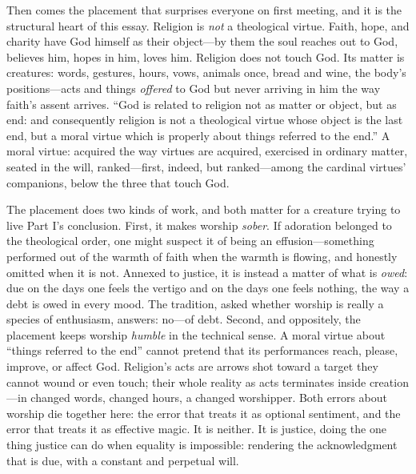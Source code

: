 Then comes the placement that surprises everyone on first meeting, and it is the structural heart of this essay. Religion is \emph{not} a theological virtue. Faith, hope, and charity have God himself as their object---by them the soul reaches out to God, believes him, hopes in him, loves him. Religion does not touch God. Its matter is creatures: words, gestures, hours, vows, animals once, bread and wine, the body's positions---acts and things \emph{offered} to God but never arriving in him the way faith's assent arrives. ``God is related to religion not as matter or object, but as end: and consequently religion is not a theological virtue whose object is the last end, but a moral virtue which is properly about things referred to the end.'' A moral virtue: acquired the way virtues are acquired, exercised in ordinary matter, seated in the will, ranked---first, indeed, but ranked---among the cardinal virtues' companions, below the three that touch God.

The placement does two kinds of work, and both matter for a creature trying to live Part I's conclusion. First, it makes worship \emph{sober}. If adoration belonged to the theological order, one might suspect it of being an effusion---something performed out of the warmth of faith when the warmth is flowing, and honestly omitted when it is not. Annexed to justice, it is instead a matter of what is \emph{owed}: due on the days one feels the vertigo and on the days one feels nothing, the way a debt is owed in every mood. The tradition, asked whether worship is really a species of enthusiasm, answers: no---of debt. Second, and oppositely, the placement keeps worship \emph{humble} in the technical sense. A moral virtue about ``things referred to the end'' cannot pretend that its performances reach, please, improve, or affect God. Religion's acts are arrows shot toward a target they cannot wound or even touch; their whole reality as acts terminates inside creation---in changed words, changed hours, a changed worshipper. Both errors about worship die together here: the error that treats it as optional sentiment, and the error that treats it as effective magic. It is neither. It is justice, doing the one thing justice can do when equality is impossible: rendering the acknowledgment that is due, with a constant and perpetual will.

